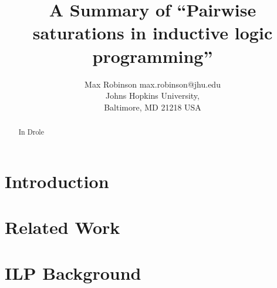 \documentclass[jair,twoside,11pt,theapa]{article}
\begin{document}
\title{A Summary of ``Pairwise saturations in inductive logic programming''}

\author{\name Max Robinson \email max.robinson@jhu.edu \\
       \addr Johns Hopkins University,\\
       Baltimore, MD 21218 USA
   }


\maketitle

\begin{abstract}
In Drole \cite{Drole2017}
\end{abstract}

\section{Introduction}
\label{Introduction}

\section{Related Work}
\label{relatedwork}

\section{ILP Background}
\label{background}



\vskip 0.2in


\end{document}

